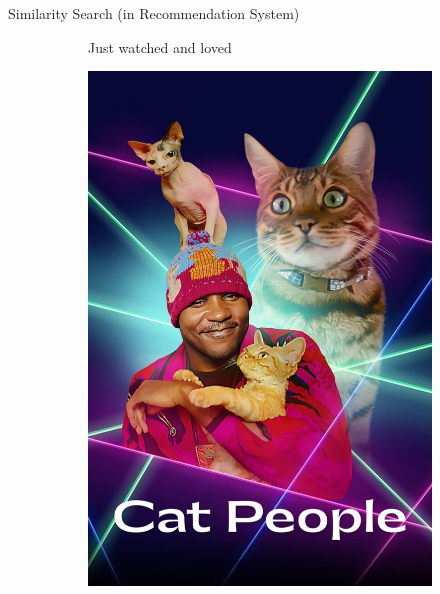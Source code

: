 \begin{frame}{Similarity Search (in Recommendation System)}
\begin{figure}[ht]
\begin{subfigure}{0.33\textwidth}
            {Just watched and loved}
        \end{subfigure}
        \hfill
        \begin{subfigure}{0.27\textwidth}
            \centering
            \includegraphics[height=0.6\textheight]{images/cat-people.jpg}


\end{subfigure}
\end{figure}
\end{frame}
